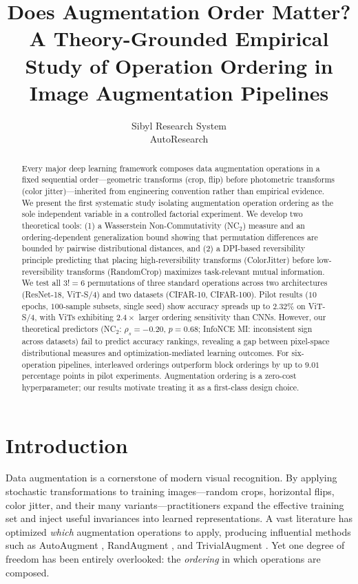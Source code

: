 \documentclass{article}
\title{Does Augmentation Order Matter? \\
A Theory-Grounded Empirical Study of Operation Ordering in Image Augmentation Pipelines}
\author{%
  Sibyl Research System \\
  AutoResearch \\
}
\begin{document}
\maketitle

\begin{abstract}
Every major deep learning framework composes data augmentation operations in a fixed sequential order---geometric transforms (crop, flip) before photometric transforms (color jitter)---inherited from engineering convention rather than empirical evidence. We present the first systematic study isolating augmentation operation ordering as the sole independent variable in a controlled factorial experiment. We develop two theoretical tools: (1) a Wasserstein Non-Commutativity (NC$_2$) measure and an ordering-dependent generalization bound showing that permutation differences are bounded by pairwise distributional distances, and (2) a DPI-based reversibility principle predicting that placing high-reversibility transforms (ColorJitter) before low-reversibility transforms (RandomCrop) maximizes task-relevant mutual information. We test all $3! = 6$ permutations of three standard operations across two architectures (ResNet-18, ViT-S/4) and two datasets (CIFAR-10, CIFAR-100). Pilot results ($10$ epochs, $100$-sample subsets, single seed) show accuracy spreads up to $2.32\%$ on ViT-S/4, with ViTs exhibiting $2.4\times$ larger ordering sensitivity than CNNs. However, our theoretical predictors (NC$_2$: $\rho_s = -0.20$, $p = 0.68$; InfoNCE MI: inconsistent sign across datasets) fail to predict accuracy rankings, revealing a gap between pixel-space distributional measures and optimization-mediated learning outcomes. For six-operation pipelines, interleaved orderings outperform block orderings by up to $9.01$ percentage points in pilot experiments. Augmentation ordering is a zero-cost hyperparameter; our results motivate treating it as a first-class design choice.
\end{abstract}

\section{Introduction}

Data augmentation is a cornerstone of modern visual recognition. By applying stochastic transformations to training images---random crops, horizontal flips, color jitter, and their many variants---practitioners expand the effective training set and inject useful invariances into learned representations. A vast literature has optimized \emph{which} augmentation operations to apply, producing influential methods such as AutoAugment \cite{cubuk2019autoaugment}, RandAugment \cite{cubuk2020randaugment}, and TrivialAugment \cite{muller2021trivialaugment}. Yet one degree of freedom has been entirely overlooked: the \emph{ordering} in which operations are composed.
\end{document}
